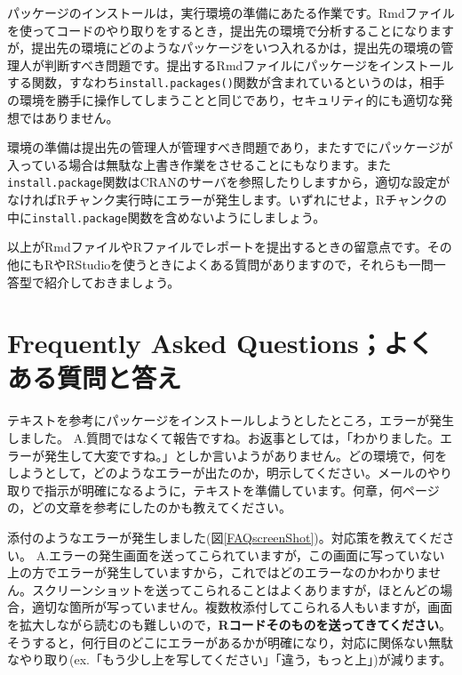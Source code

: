 \documentclass{ltjsbook}
\begin{document}
パッケージのインストールは，実行環境の準備にあたる作業です。Rmdファイルを使ってコードのやり取りをするとき，提出先の環境で分析することになりますが，提出先の環境にどのようなパッケージをいつ入れるかは，提出先の環境の管理人が判断すべき問題です。提出するRmdファイルにパッケージをインストールする関数，すなわち\verb|install.packages()|関数が含まれているというのは，相手の環境を勝手に操作してしまうことと同じであり，セキュリティ的にも適切な発想ではありません。

環境の準備は提出先の管理人が管理すべき問題であり，またすでにパッケージが入っている場合は無駄な上書き作業をさせることにもなります。また\verb|install.package|関数はCRANのサーバを参照したりしますから，適切な設定がなければRチャンク実行時にエラーが発生します。いずれにせよ，Rチャンクの中に\verb|install.package|関数を含めないようにしましょう。

以上がRmdファイルやRファイルでレポートを提出するときの留意点です。その他にもRやRStudioを使うときによくある質問がありますので，それらも一問一答型で紹介しておきましょう。


\section{Frequently Asked Questions；よくある質問と答え}
\label{FreaquentlyAskedQuestions}

\begin{FAQ}{テキストを参考にパッケージをインストールしようとしたところ，エラーが発生しました。}{}
	\tcblower
	{\large A.}質問ではなくて報告ですね。お返事としては，「わかりました。エラーが発生して大変ですね。」としか言いようがありません。どの環境で，何をしようとして，どのようなエラーが出たのか，明示してください。メールのやり取りで指示が明確になるように，テキストを準備しています。何章，何ページの，どの文章を参考にしたのかも教えてください。
\end{FAQ}

\begin{FAQ}{添付のようなエラーが発生しました(図\ref{FAQscreenShot})。対応策を教えてください。}{}
	\tcblower
	{\large A.}エラーの発生画面を送ってこられていますが，この画面に写っていない上の方でエラーが発生していますから，これではどのエラーなのかわかりません。スクリーンショットを送ってこられることはよくありますが，ほとんどの場合，適切な箇所が写っていません。複数枚添付してこられる人もいますが，画面を拡大しながら読むのも難しいので，\textbf{Rコードそのものを送ってきてください}。そうすると，何行目のどこにエラーがあるかが明確になり，対応に関係ない無駄なやり取り(ex.「もう少し上を写してください」「違う，もっと上」)が減ります。
\end{FAQ}
\end{document}
